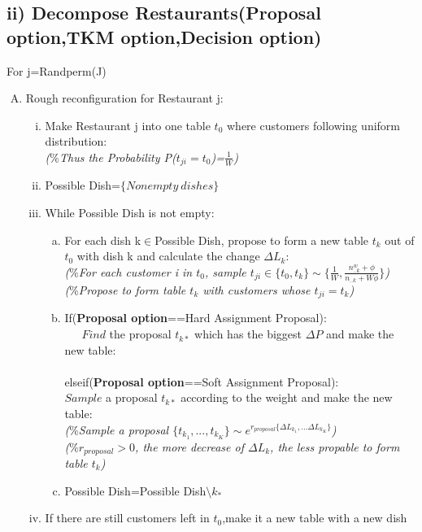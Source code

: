 \documentclass{article}
\begin{document}
\begin{spacing}{1.1}
\subsection{ii) Decompose Restaurants(Proposal option,TKM option,Decision option)}
For j=Randperm(J)
\begin{enumerate}[(A)]
\item Rough reconfiguration for Restaurant j:
\begin{enumerate}[(i)]
\item Make Restaurant j into one table $t_{0}$ where customers following uniform distribution:\\
\small{\emph{($\%$Thus the Probability P($t_{ji}=t_{0}$)=$\frac{1}{W}$)}}
\item Possible Dish=$\{Nonempty \ dishes\}$
\item While Possible Dish is not empty:
\begin{enumerate}[(a)]
\item For each dish k$\in$Possible Dish, propose to form a new table $t_{k}$ out of $t_{0}$ with dish k and calculate the change $\Delta L_{k}$:\\
\small{\emph{($\%$For each customer i in $t_{0}$, sample $t_{ji}\in\{t_{0},t_{k}\}\sim\{\frac{1}{W},\frac{n_{..k}^{w}+\phi}{n_{..k}+W\phi}\}$)}}\\
\small{\emph{($\%$Propose to form table $t_{k}$ with customers whose $t_{ji}=t_{k}$)}}
\item If({\bf Proposal option}==Hard Assignment Proposal):\\
\ \ \ $Find$ the proposal $t_{k*}$ which has the biggest $\Delta P$ and make the new table:\\ \\
elseif({\bf Proposal option}==Soft Assignment Proposal):\\
$Sample$ a proposal $t_{k*}$ according to the weight and make the new table:\\
\small{\emph{($\%$Sample a proposal $\{t_{k_{1}},...,t_{k_{K}}\}\sim e^{r_{proposal}\{\Delta L_{k_{1}},...\Delta L_{k_{K}}\}}$)}}\\
\small{\emph{($\%r_{proposal}>0$, the more decrease of $\Delta L_{k}$, the less propable to form table $t_{k}$)}}
\item Possible Dish=Possible Dish$\setminus k_{*}$
\end{enumerate}
\item If there are still customers left in $t_{0}$,make it a new table with a new dish
\end{enumerate}


\end{enumerate}
\end{spacing}
\end{document}
